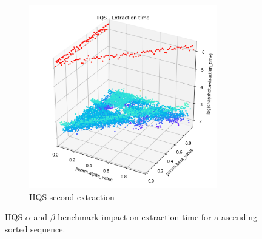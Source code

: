 \begin{figure}
\begin{subfigure}[b]{0.45\textwidth}
        \includegraphics[width=0.9\textwidth]{./fragments/04_experimental_execution/images/04_alphabeta_noclass_asc.png.0_0.png}
        \caption{IIQS second extraction}
        \label{FIG:05_ALPHABETA_RELATIONSHIP_ASC__0_1}
    \end{subfigure}

    \caption{IIQS $\alpha$ and $\beta$ benchmark impact on extraction time for a ascending sorted sequence.}
    \label{FIG:05_ALPHABETA_RELATIONSHIP_ASC}
\end{figure}


